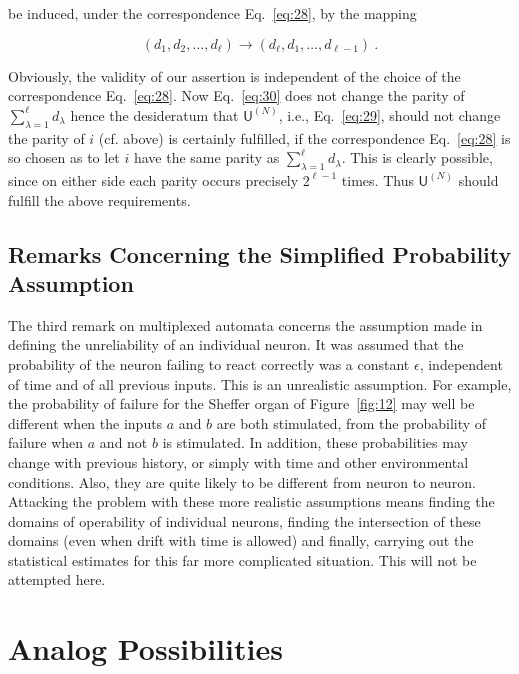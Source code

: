 \documentclass[twocolumn,preprintnumbers,amsmath,amssymb,floatfix]{revtex4}
\begin{document}
\noindent be induced, under the correspondence Eq.~\ref{eq:28}, by
the mapping

\begin{equation}
\label{eq:30} (d_1,d_2,\ldots,d_\ell)\rightarrow
(d_\ell,d_1,\ldots,d_{\ell-1})~.
\end{equation}

\noindent Obviously, the validity of our assertion is independent
of the choice of the correspondence Eq.~\ref{eq:28}. Now
Eq.~\ref{eq:30} does not change the parity of
$\sum_{\lambda=1}^\ell d_\lambda$ hence the desideratum that
$\textsf{U}^{(N)}$, i.e., Eq.~\ref{eq:29}, should not change the
parity of $i$ (cf. above) is certainly fulfilled, if the
correspondence Eq.~\ref{eq:28} is so chosen as to let $i$ have the
same parity as $\sum_{\lambda=1}^\ell d_\lambda$. This is clearly
possible, since on either side each parity occurs precisely
$2^{\ell-1}$ times. Thus $\textsf{U}^{(N)}$ should fulfill the
above requirements.

\subsection{\label{sec:eleven3}Remarks Concerning the Simplified Probability Assumption}

The third remark on multiplexed automata concerns the assumption
made in defining the unreliability of an individual neuron. It was
assumed that the probability of the neuron failing to react
correctly was a constant $\epsilon$, independent of time and of
all previous inputs. This is an unrealistic assumption. For
example, the probability of failure for the Sheffer organ of
Figure~\ref{fig:12} may well be different when the inputs $a$ and
$b$ are both stimulated, from the probability of failure when $a$
and not $b$ is stimulated. In addition, these probabilities may
change with previous history, or simply with time and other
environmental conditions. Also, they are quite likely to be
different from neuron to neuron. Attacking the problem with these
more realistic assumptions means finding the domains of
operability of individual neurons, finding the intersection of
these domains (even when drift with time is allowed) and finally,
carrying out the statistical estimates for this far more
complicated situation. This will not be attempted here.

\section{\label{sec:twelve}Analog Possibilities}
\end{document}
